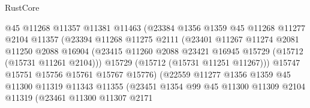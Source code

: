 \begin{lexlean}{RustCore}
\begin{coremodule}
                                @45
                                @11268
                                @11357
                                @11381
                                @11463
                                (@23384
                                  @1356
                                  @1359
                                  @45
                                  @11268
                                  @11277
                                  @2104
                                  @11357
                                  (@23394
                                    @11268
                                    @11275
                                    @2111
                                    (@23401
                                      @11267
                                      @11274
                                      @2081
                                      @11250
                                      @2088
                                      @16904
                                      (@23415
                                        @11260
                                        @2088
                                        @23421
                                        @16945
                                        @15729
                                        (@15712 (@15731 @11261 @2104)))
                                      @15729
                                      (@15712 (@15731 @11251 @11267)))
                                    @15747
                                    @15751
                                    @15756
                                    @15761
                                    @15767
                                    @15776)
                                  (@22559
                                    @11277
                                    @1356
                                    @1359
                                    @45
                                    @11300
                                    @11319
                                    @11343
                                    @11355
                                    (@23451
                                      @1354
                                      @99
                                      @45
                                      @11300
                                      @11309
                                      @2104
                                      @11319
                                      (@23461
                                        @11300
                                        @11307
                                        @2171

\end{coremodule}
\end{lexlean}
